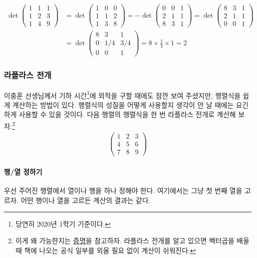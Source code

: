 \begin{align*}
\det\begin{pmatrix}
1 & 1 & 1\\
1 & 2 & 3\\
1 & 4 & 9
\end{pmatrix}&=\det\begin{pmatrix}
1 & 0 & 0\\
1 & 1 & 2\\
1 & 3 & 8
\end{pmatrix}=-\det\begin{pmatrix}
0 & 0 & 1\\
2 & 1 & 1\\
8 & 3 & 1
\end{pmatrix}=\det\begin{pmatrix}
8 & 3 & 1\\
2 & 1 & 1\\
0 & 0 & 1
\end{pmatrix}\\
&=\det\begin{pmatrix}
8 & 3 & 1\\
0 & 1/4 & 3/4\\
0 & 0 & 1
\end{pmatrix}=8\times\frac{1}{4}\times1=2
\end{align*}

\subsubsection{라플라스 전개}
이충훈 선생님께서 기하 시간\footnote{당연히 2020년 1학기 기준이다.}에 외적을 구할 때에도 잠깐 보여 주셨지만, 행렬식을 쉽게 계산하는 방법이 있다. 행렬식의 성질을 어떻게 사용할지 생각이 안 날 때에는 요긴하게 사용할 수 있을 것이다. 다음 행렬의 행렬식을 한 번 라플라스 전개로 계산해 보자.\footnote{이게 왜 가능한지는 \href{https://en.wikipedia.org/wiki/Laplace_expansion\#Proof}{증명}을 참고하자. 라플라스 전개를 알고 있으면 벡터곱을 배울 때 책에 나오는 공식 일부를 외울 필요 없이 계산이 쉬워진다.}
\begin{align*}
\begin{pmatrix}
1 & 2 & 3\\
4 & 5 & 6\\
7 & 8 & 9
\end{pmatrix}
\end{align*}
\paragraph{행/열 정하기} 우선 주어진 행렬에서 열이나 행을 하나 정해야 한다. 여기에서는 그냥 첫 번째 열을 고르자. 어떤 행이나 열을 고르든 계산의 결과는 같다.
